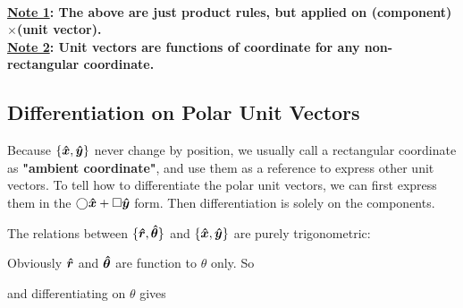 \documentclass[class=article, crop=false, 12pt]{standalone}
\begin{document}
\hfill\\
\bf{\ul{Note 1}}: The above are just product rules, but applied on (component)$\times$(unit vector).\\

\bf{\ul{Note 2}}: Unit vectors are functions of coordinate for any non-rectangular coordinate.




\subsection{Differentiation on Polar Unit Vectors}

Because $\{\vu*{x}, \vu*{y}\}$ never change by position, 
we usually call a rectangular coordinate as \textbf{"ambient coordinate"},
and use them as a reference to express other unit vectors. 
To tell how to differentiate the polar unit vectors, 
we can first express them in the $\bigcirc\vu*{x} + \square\vu*{y}$ form. 
Then differentiation is solely on the components.


The relations between $\{\vu*{r}, \vu*{\theta}\}$ and $\{\vu*{x}, \vu*{y}\}$ are purely trigonometric:

Obviously $\vu*{r}$ and $\vu*{\theta}$ are function to $\theta$ only. So

and differentiating on $\theta$ gives
\end{document}
